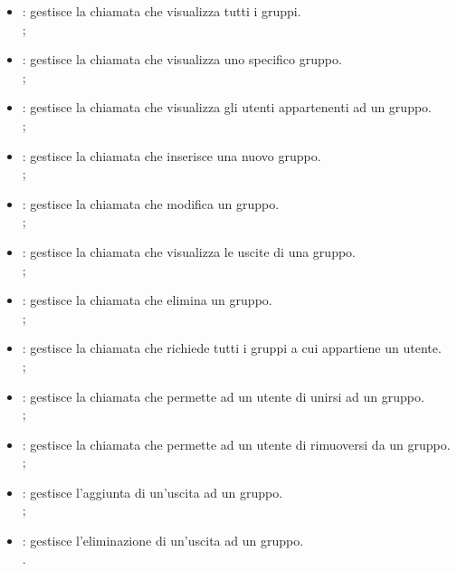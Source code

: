 \begin{itemize}
    \item {}: gestisce la chiamata che visualizza tutti i gruppi.\\ ;
    \item {}:  gestisce la chiamata che visualizza uno specifico gruppo. \\ ;
    \item {}: gestisce la chiamata che visualizza gli utenti appartenenti ad un gruppo. \\ ;
    \item {}: gestisce la chiamata che inserisce una nuovo gruppo. \\ ;
    \item {}: gestisce la chiamata che modifica un gruppo.\\ ;
    \item {}: gestisce la chiamata che visualizza le uscite di una gruppo.\\ ;
    \item {}: gestisce la chiamata che elimina un gruppo. \\ ;
    \item {}: gestisce la chiamata che richiede tutti i gruppi a cui appartiene un utente. \\ ;
    \item {}: gestisce la chiamata che permette ad un utente di unirsi ad un gruppo. \\ ;
    \item {}: gestisce la chiamata che permette ad un utente di rimuoversi da un gruppo. \\ ;
    \item {}:  gestisce l'aggiunta di un'uscita ad un gruppo. \\ ;
    \item {}: gestisce l'eliminazione di un'uscita ad un gruppo. \\ .  
\end{itemize}


